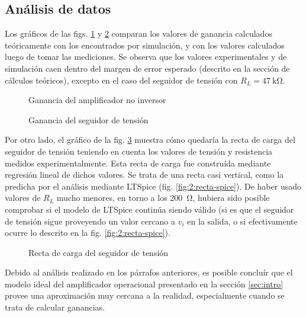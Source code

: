 \subsection{Análisis de datos}

Los gráficos de las figs. \ref{fig:2-analisis:ganancia-opamp} y 
\ref{fig:2-analisis:ganancia-seguidor} comparan los valores
de ganancia calculados teóricamente con los encontrados por simulación, y con
los valores calculados luego de tomar las mediciones. Se observa que los
valores experimentales y de simulación caen dentro del margen de error
esperado (descrito en la sección de cálculos teóricos), excepto en el caso del
seguidor de tensión con $R_L = \SI{47}{\kilo\ohm}$.

\begin{figure}[H]
    \centering
    
    \caption{Ganancia del amplificador no inversor}
    \label{fig:2-analisis:ganancia-opamp}
\end{figure}

\begin{figure}[H]
    \centering
    
    \caption{Ganancia del seguidor de tensión}
    \label{fig:2-analisis:ganancia-seguidor}
\end{figure}

Por otro lado, el gráfico de la fig. \ref{fig:2-analisis:recta-carga} muestra
cómo quedaría la recta de carga del seguidor de tensión teniendo en cuenta
los valores de tensión y resistencia medidos experimentalmente. Esta recta de
carga fue construída mediante regresión lineal de dichos valores. Se trata de 
una recta casi vertical, como la predicha por el análisis mediante LTSpice 
(fig. \ref{fig:2:recta-spice}). De haber usado valores de $R_L$ mucho
menores, en torno a los \SI{200}{\ohm}, hubiera sido posible comprobar si
el modelo de LTSpice continúa siendo válido (si es que el seguidor de
tensión sigue proveyendo un valor cercano a $v_i$ en la salida, o si
efectivamente ocurre lo descrito en la fig. \ref{fig:2:recta-spice}).

\begin{figure}[H]
    \centering
    
    \caption{Recta de carga del seguidor de tensión}
    \label{fig:2-analisis:recta-carga}
\end{figure}

Debido al análisis realizado en los párrafos anteriores, es posible concluír
que el modelo ideal del amplificador operacional presentado en la sección
\ref{sec:intro} provee una aproximación muy cercana a la realidad, 
especialmente cuando se trata de calcular ganancias.
